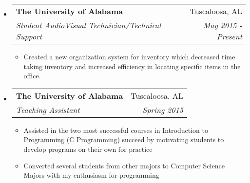 \documentclass[letterpaper,10pt]{article}
\makeatletter
\newcommand{\resitem}[1]{\item #1 \vspace{-2pt}}
\newcommand{\ressubheading}[4]{
    \begin{tabular*}{6.5in}{l@{\cftdotfill{\cftsecdotsep}\extracolsep{\fill}}r}
      \textbf{#1} & #2 \\
      \textit{#3} & \textit{#4} \\
  \end{tabular*}\vspace{-6pt}}
\makeatother
\begin{document}
  \begin{itemize}

    \item
      \ressubheading{The University of Alabama}{Tuscaloosa, AL}{Student AudioVisual Technician/Technical Support}{May 2015 - Present}
      \begin{itemize}
        \resitem{Created a new organization system for inventory which decreased time taking inventory and increased efficiency in locating specific items in the office.}
      \end{itemize}

    \item
      \ressubheading{The University of Alabama}{Tuscaloosa, AL}{Teaching Assistant}{Spring 2015}
      \begin{itemize}
          \resitem{Assisted in the two most successful courses in Introduction to Programming (C Programming) succeed by motivating students to develop programs on their own for practice}
          \resitem{Converted several students from other majors to Computer Science Majors with my enthusiasm for programming}
      \end{itemize}
  \end{itemize}


  
\end{document}
